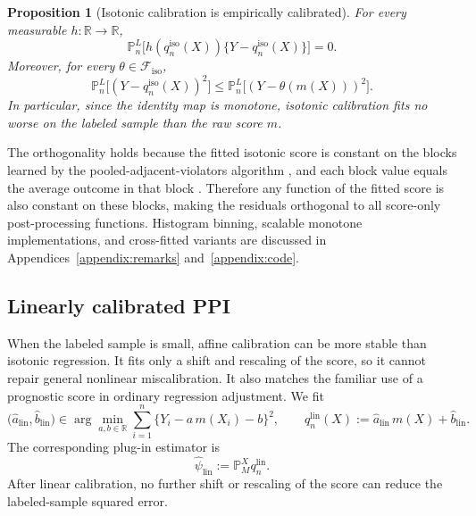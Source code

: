 \documentclass{article}
\theoremstyle{plain}
\newtheorem{proposition}{Proposition}
\theoremstyle{definition}
\newcommand{\R}{\mathbb{R}}
\newcommand{\1}{\mathbf{1}}
\newcommand{\mhat}{m}
\newcommand{\Pl}{\mathbb{P}^{L}_n}
\newcommand{\Pmx}{\mathbb{P}^{X}_M}
\begin{document}
\begin{proposition}[Isotonic calibration is empirically calibrated]
\label{prop:iso-repr}
For every measurable \(h:\R\to\R\),
\begin{equation}
\label{eq:orth}
\Pl\bigl[h(q_n^{\mathrm{iso}}(X))
\{Y-q_n^{\mathrm{iso}}(X)\}\bigr]=0.
\end{equation}
Moreover, for every \(\theta \in \mathcal F_{\mathrm{iso}}\),
\[
\Pl\bigl[(Y-q_n^{\mathrm{iso}}(X))^2\bigr]
\le
\Pl\bigl[(Y-\theta(\mhat(X)))^2\bigr].
\]
In particular, since the identity map is monotone, isotonic calibration fits no
worse on the labeled sample than the raw score \(\mhat\).
\end{proposition}

The orthogonality holds because the fitted isotonic score is constant on the
blocks learned by the pooled-adjacent-violators algorithm \citep{barlow1972isotonic}, and each block value
equals the average outcome in that block \citep{van2023causal}. Therefore any function of the fitted
score is also constant on these blocks, making the residuals orthogonal to all
score-only post-processing functions. Histogram binning, scalable monotone
implementations, and cross-fitted variants are discussed in
Appendices~\ref{appendix:remarks} and~\ref{appendix:code}.

\subsection{Linearly calibrated PPI}
\label{sec:linear}

When the labeled sample is small, affine calibration can be more stable than
isotonic regression. It fits only a shift and rescaling of the score, so it
cannot repair general nonlinear miscalibration. It also matches the familiar use
of a prognostic score in ordinary regression adjustment. We fit
\begin{equation}
\label{eq:linear-cal}
\bigl(\hat a_{\mathrm{lin}},\hat b_{\mathrm{lin}}\bigr)
\in
\arg\min_{a,b\in\R}
\sum_{i=1}^n \{Y_i-a\,\mhat(X_i)-b\}^2,
\qquad
q_n^{\mathrm{lin}}(X)
:=
\hat a_{\mathrm{lin}}\,\mhat(X)+\hat b_{\mathrm{lin}} .
\end{equation}
The corresponding plug-in estimator is
\begin{equation}
\label{eq:linear-plugin}
\widehat{\psi}_{\mathrm{lin}}
:=
\Pmx q_n^{\mathrm{lin}}.
\end{equation}
After linear calibration, no further shift or rescaling of the score can reduce
the labeled-sample squared error.
\end{document}
